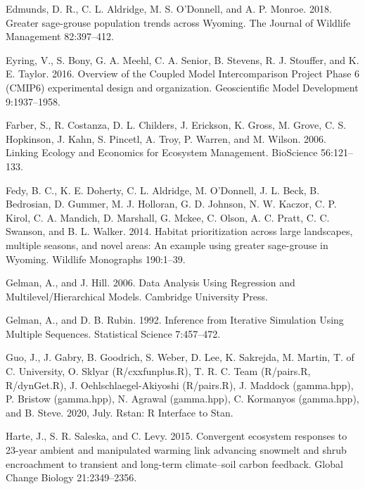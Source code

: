 \documentclass[
  12pt,
]{article}
\newlength{\cslhangindent}
\newenvironment{CSLReferences}[2] %
 {%
  \setlength{\parindent}{0pt}
  \ifodd #1 \everypar{\setlength{\hangindent}{\cslhangindent}}\ignorespaces\fi
  \ifnum #2 > 0
  \setlength{\parskip}{#2\baselineskip}
  \fi
 }%
 {}
\begin{document}
\begin{CSLReferences}{1}{0}
\leavevmode{}%
Edmunds, D. R., C. L. Aldridge, M. S. O'Donnell, and A. P. Monroe. 2018. Greater sage-grouse population trends across {Wyoming}. The Journal of Wildlife Management 82:397--412.

\leavevmode{}%
Eyring, V., S. Bony, G. A. Meehl, C. A. Senior, B. Stevens, R. J. Stouffer, and K. E. Taylor. 2016. Overview of the {Coupled} {Model} {Intercomparison} {Project} {Phase} 6 ({CMIP6}) experimental design and organization. Geoscientific Model Development 9:1937--1958.

\leavevmode{}%
Farber, S., R. Costanza, D. L. Childers, J. Erickson, K. Gross, M. Grove, C. S. Hopkinson, J. Kahn, S. Pincetl, A. Troy, P. Warren, and M. Wilson. 2006. Linking {Ecology} and {Economics} for {Ecosystem} {Management}. BioScience 56:121--133.

\leavevmode{}%
Fedy, B. C., K. E. Doherty, C. L. Aldridge, M. O'Donnell, J. L. Beck, B. Bedrosian, D. Gummer, M. J. Holloran, G. D. Johnson, N. W. Kaczor, C. P. Kirol, C. A. Mandich, D. Marshall, G. Mckee, C. Olson, A. C. Pratt, C. C. Swanson, and B. L. Walker. 2014. Habitat prioritization across large landscapes, multiple seasons, and novel areas: {An} example using greater sage-grouse in {Wyoming}. Wildlife Monographs 190:1--39.

\leavevmode{}%
Gelman, A., and J. Hill. 2006. Data {Analysis} {Using} {Regression} and {Multilevel}/{Hierarchical} {Models}. Cambridge University Press.

\leavevmode{}%
Gelman, A., and D. B. Rubin. 1992. Inference from {Iterative} {Simulation} {Using} {Multiple} {Sequences}. Statistical Science 7:457--472.

\leavevmode{}%
Guo, J., J. Gabry, B. Goodrich, S. Weber, D. Lee, K. Sakrejda, M. Martin, T. of C. University, O. Sklyar (R/cxxfunplus.R), T. R. C. Team (R/pairs.R, R/dynGet.R), J. Oehlschlaegel-Akiyoshi (R/pairs.R), J. Maddock (gamma.hpp), P. Bristow (gamma.hpp), N. Agrawal (gamma.hpp), C. Kormanyos (gamma.hpp), and B. Steve. 2020, July. Rstan: {R} {Interface} to {Stan}.

\leavevmode{}%
Harte, J., S. R. Saleska, and C. Levy. 2015. Convergent ecosystem responses to 23-year ambient and manipulated warming link advancing snowmelt and shrub encroachment to transient and long-term climate--soil carbon feedback. Global Change Biology 21:2349--2356.


\end{CSLReferences}
\end{document}
